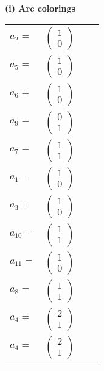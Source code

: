 \documentclass[1p]{elsarticle_modified}
\theoremstyle{definition}
\begin{document}
\flushleft \textbf{(i) Arc colorings}\\
\begin{tabular}{m{7pt} m{180pt} m{7pt} m{180pt} }
\flushright $a_{2}=$&$\begin{pmatrix}1\\0\end{pmatrix}$ \\
\flushright $a_{5}=$&$\begin{pmatrix}1\\0\end{pmatrix}$ \\
\flushright $a_{6}=$&$\begin{pmatrix}1\\0\end{pmatrix}$ \\
\flushright $a_{9}=$&$\begin{pmatrix}0\\1\end{pmatrix}$ \\
\flushright $a_{7}=$&$\begin{pmatrix}1\\1\end{pmatrix}$ \\
\flushright $a_{1}=$&$\begin{pmatrix}1\\0\end{pmatrix}$ \\
\flushright $a_{3}=$&$\begin{pmatrix}1\\0\end{pmatrix}$ \\
\flushright $a_{10}=$&$\begin{pmatrix}1\\1\end{pmatrix}$ \\
\flushright $a_{11}=$&$\begin{pmatrix}1\\0\end{pmatrix}$ \\
\flushright $a_{8}=$&$\begin{pmatrix}1\\1\end{pmatrix}$ \\
\flushright $a_{4}=$&$\begin{pmatrix}2\\1\end{pmatrix}$\\ \flushright $a_{4}=$&$\begin{pmatrix}2\\1\end{pmatrix}$\\&\end{tabular}
\end{document}
